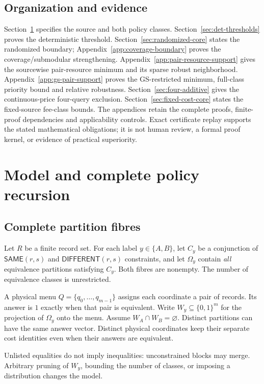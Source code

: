 \documentclass[pdflatex,sn-mathphys-num]{sn-jnl}
\newcommand{\SAME}{\mathsf{SAME}}
\newcommand{\DIFF}{\mathsf{DIFFERENT}}
\theoremstyle{thmstyleone}
\theoremstyle{thmstylethree}
\theoremstyle{thmstyletwo}
\begin{document}
\subsection{Organization and evidence}
Section~\ref{sec:model-core} specifies the source and both policy classes.
Section~\ref{sec:det-thresholds} proves the deterministic threshold.
Section~\ref{sec:randomized-core} states the randomized boundary;
Appendix~\ref{app:coverage-boundary} proves the coverage/submodular strengthening.
Appendix~\ref{app:pair-resource-support} gives the sourcewise pair-resource
minimum and its sparse robust neighborhood.
Appendix~\ref{app:gs-pair-support} proves the GS-restricted minimum,
full-class priority bound and relative robustness.
Section~\ref{sec:four-additive} gives the continuous-price four-query
exclusion. Section~\ref{sec:fixed-cost-core} states the fixed-source
fee-class bounds. The appendices retain the complete proofs, finite-proof
dependencies and applicability controls. Exact certificate replay supports
the stated mathematical obligations; it is not human review, a formal
proof kernel, or evidence of practical superiority.

\section{Model and complete policy recursion}\label{sec:model-core}
\subsection{Complete partition fibres}
Let $R$ be a finite record set. For each label $y\in\{A,B\}$, let $C_y$ be a conjunction of $\SAME(r,s)$ and $\DIFF(r,s)$ constraints, and let $\Omega_y$ contain \emph{all} equivalence partitions satisfying $C_y$. Both fibres are nonempty. The number of equivalence classes is unrestricted.

A physical menu $Q=\{q_0,\ldots,q_{m-1}\}$ assigns each coordinate a pair of records. Its answer is $1$ exactly when that pair is equivalent. Write $W_y\subseteq\{0,1\}^m$ for the projection of $\Omega_y$ onto the menu. Assume $W_A\cap W_B=\varnothing$. Distinct partitions can have the same answer vector. Distinct physical coordinates keep their separate cost identities even when their answers are equivalent.

Unlisted equalities do not imply inequalities: unconstrained blocks may merge. Arbitrary pruning of $W_y$, bounding the number of classes, or imposing a distribution changes the model.
\end{document}
